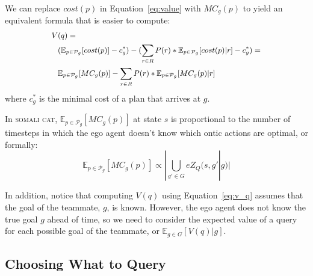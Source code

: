 \documentclass[letterpaper]{article}
\begin{document}
\noindent We can replace $cost(p)$ in Equation~\ref{eq:value} with $MC_g(p)$ to yield an equivalent formula that is easier to compute:
\begin{equation}
\small
\begin{split}
    V & (q) = \\
    & (\mathbb{E}_{p\in \mathcal{P}_g}[cost(p)] - c^*_g) - (\sum\limits_{r\in R}P(r)*\mathbb{E}_{p\in \mathcal{P}_g}[cost(p) | r] - c^*_g) =\\ &
    \mathbb{E}_{p\in \mathcal{P}_g}[MC_g(p)] - \sum\limits_{r\in R}P(r)*\mathbb{E}_{p\in \mathcal{P}_g}[MC_g(p) | r]
    \end{split}
    \label{eq:v_q}
\end{equation}
where $c^*_g$ is the minimal cost of a plan that arrives at $g$.

In \textsc{somali cat},
$\mathbb{E}_{p\in\mathcal{P}_g}[MC_g(p)]$ at state $s$ is proportional to the number of timesteps in which the ego agent doesn't know which ontic actions are optimal, or formally:
\begin{equation*}
    \mathbb{E}_{p\in \mathcal{P}_g}[MC_g(p)]\propto |\bigcup\limits_{g'\in G}eZ_Q(s, g' | g)|
\end{equation*}

In addition, notice that computing $V(q)$ using Equation~\ref{eq:v_q} assumes that the goal of the teammate, $g$, is known. However, the ego agent does not know the true goal $g$ ahead of time, so we need to consider the expected value of a query for each possible goal of the teammate, or $\mathbb{E}_{g\in G}[V(q) | g]$.













\subsection{Choosing What to Query}
\end{document}
